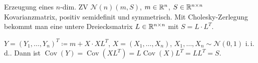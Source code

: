 \documentclass{cheat-sheet}
\newcommand{\iid}{i.\,i.\,d.} %
\DeclareMathOperator{\cov}{Cov} %
\newcommand{\Normal}{\mathcal{N}} %
\begin{document}

Erzeugung eines $n$-dim. ZV $\Normal(n)(m, S)$, $m \in \mathbb{R}^n$, $S \in \mathbb{R}^{n \times n}$ Kovarianzmatrix, positiv semidefinit und symmetrisch.
Mit Cholesky-Zerlegung bekommt man eine untere Dreiecksmatrix $L \in \mathbb{R}^{n \times n}$ mit $S = L \cdot L^T$.

$Y = (Y_1, \ldots, Y_n)^T \coloneqq m + X \cdot X L^T$, $X = (X_1, \ldots, X_n)$, $X_1, \ldots, X_n \sim \Normal(0, 1)$ \iid{}.
Dann ist $\cov(Y) = \cov(X L^T) = L \cov(X) L^T = L L^T = S$.
\end{document}
